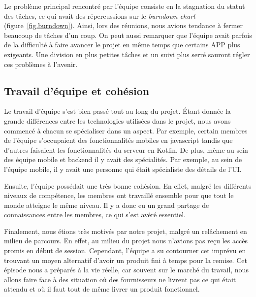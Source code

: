     Le problème principal rencontré par l'équipe consiste en la stagnation du statut des tâches, ce qui avait des répercussions sur le \emph{burndown chart} (figure~\ref{fig.burndown}). Ainsi, lors des réunions, nous avions tendance à fermer beaucoup de tâches d'un coup. On peut aussi remarquer que l'équipe avait parfois de la difficulté à faire avancer le projet en même temps que certains APP plus exigeants. Une division en plus petites tâches et un suivi plus serré sauront régler ces problèmes à l'avenir.

    \subsection{Travail d'équipe et cohésion}
    Le travail d'équipe s'est bien passé tout au long du projet. Étant donnée la grande différences entre les technologies utilisées dans le projet, nous avons commencé à chacun se spécialiser dans un aspect. Par exemple, certain membres de l'équipe s'occupaient des fonctionnalités mobiles en javascript tandis que d'autres faisaient les fonctionnalités du serveur en Kotlin. De plus, même au sein des équipe mobile et backend il y avait des spécialités. Par exemple, au sein de l'équipe mobile, il y avait une personne qui était spécialiste des détails de l'UI.

    Ensuite, l'équipe possédait une très bonne cohésion. En effet, malgré les différents niveaux de compétence, les membres ont travaillé ensemble pour que tout le monde atteigne le même niveau. Il y a donc eu un grand partage de connaissances entre les membres, ce qui s'est avéré essentiel.

    Finalement, nous étions très motivés par notre projet, malgré un relâchement en milieu de parcours. En effet, au milieu du projet nous n'avions pas reçu les accès promis en début de session. Cependant, l'équipe a su contourner cet imprévu en trouvant un moyen alternatif d'avoir un produit fini à temps pour la remise. Cet épisode nous a préparés à la vie réelle, car souvent sur le marché du travail, nous allons faire face à des situation où des fournisseurs ne livrent pas ce qui était attendu et où il faut tout de même livrer un produit fonctionnel.
    